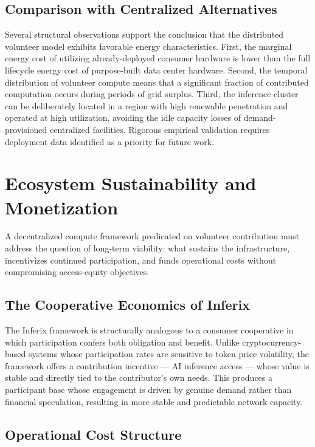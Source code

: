\documentclass[12pt]{article}
\begin{document}
\subsection{Comparison with Centralized Alternatives}

Several structural observations support the conclusion that the distributed volunteer model exhibits favorable energy characteristics. First, the marginal energy cost of utilizing already-deployed consumer hardware is lower than the full lifecycle energy cost of purpose-built data center hardware. Second, the temporal distribution of volunteer compute means that a significant fraction of contributed computation occurs during periods of grid surplus. Third, the inference cluster can be deliberately located in a region with high renewable penetration and operated at high utilization, avoiding the idle capacity losses of demand-provisioned centralized facilities. Rigorous empirical validation requires deployment data identified as a priority for future work.

\section{Ecosystem Sustainability and Monetization}
\label{sec:sustainability}

A decentralized compute framework predicated on volunteer contribution must address the question of long-term viability: what sustains the infrastructure, incentivizes continued participation, and funds operational costs without compromising access-equity objectives.

\subsection{The Cooperative Economics of Inferix}

The Inferix framework is structurally analogous to a consumer cooperative in which participation confers both obligation and benefit. Unlike cryptocurrency-based systems whose participation rates are sensitive to token price volatility, the framework offers a contribution incentive — AI inference access — whose value is stable and directly tied to the contributor's own needs. This produces a participant base whose engagement is driven by genuine demand rather than financial speculation, resulting in more stable and predictable network capacity.

\subsection{Operational Cost Structure}
\end{document}
